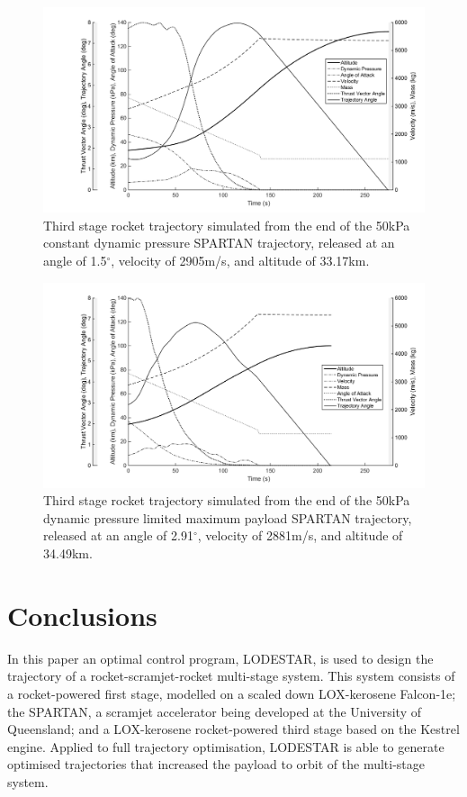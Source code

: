 \documentclass[]{aiaa-tc}
\newcommand{\SeparationAltConstq}{33.17}
\newcommand{\SeparationAltFiftykPa}{34.49}
\newcommand{\SeparationvConstq}{2905}
\newcommand{\SeparationvFiftykPa}{2881}
\newcommand{\SeparationAngleConstq}{1.5}
\newcommand{\SeparationAngleFiftykPa}{2.91}
\begin{document}
\begin{figure}[H]
	\centering
	\includegraphics[width=0.8\linewidth]{ThirdStageConstQ}
	\caption{Third stage rocket trajectory simulated from the end of the 50kPa constant dynamic pressure SPARTAN trajectory, released at an angle of \SeparationAngleConstq $^\circ$, velocity of \SeparationvConstq m/s, and altitude of \SeparationAltConstq km.}
	\label{fig:ThirdStageConstQ}
\end{figure}
\begin{figure}[H]
	
	\centering
	\includegraphics[width=0.8\linewidth]{ThirdStage50kpaConstrained}
	\caption{Third stage rocket trajectory simulated from the end of the 50kPa dynamic pressure limited maximum payload SPARTAN trajectory, released at an angle of \SeparationAngleFiftykPa $^\circ$, velocity of \SeparationvFiftykPa m/s, and altitude of \SeparationAltFiftykPa km.}
	\label{fig:ThirdStage50kPa}
\end{figure}

\section{Conclusions}


In this paper an optimal control program, LODESTAR, is used to design the trajectory of a rocket-scramjet-rocket multi-stage system. This system consists of a rocket-powered first stage, modelled on a scaled down LOX-kerosene Falcon-1e; the SPARTAN, a scramjet accelerator being developed at the University of Queensland; and a LOX-kerosene rocket-powered third stage based on the Kestrel engine. Applied to full trajectory optimisation, LODESTAR is able to generate optimised trajectories that increased the payload to orbit of the multi-stage system.
\end{document}
